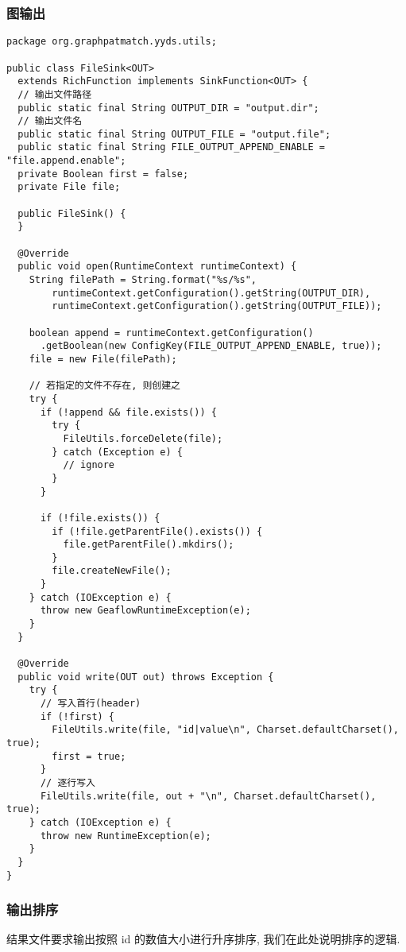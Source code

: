 \subsubsection{图输出}
\begin{center}
\begin{verbatim}
package org.graphpatmatch.yyds.utils;

public class FileSink<OUT>
  extends RichFunction implements SinkFunction<OUT> {
  // 输出文件路径
  public static final String OUTPUT_DIR = "output.dir";
  // 输出文件名
  public static final String OUTPUT_FILE = "output.file";
  public static final String FILE_OUTPUT_APPEND_ENABLE = "file.append.enable";
  private Boolean first = false;
  private File file;

  public FileSink() {
  }

  @Override
  public void open(RuntimeContext runtimeContext) {
    String filePath = String.format("%s/%s",
        runtimeContext.getConfiguration().getString(OUTPUT_DIR),
        runtimeContext.getConfiguration().getString(OUTPUT_FILE));

    boolean append = runtimeContext.getConfiguration()
      .getBoolean(new ConfigKey(FILE_OUTPUT_APPEND_ENABLE, true));
    file = new File(filePath);

    // 若指定的文件不存在, 则创建之
    try {
      if (!append && file.exists()) {
        try {
          FileUtils.forceDelete(file);
        } catch (Exception e) {
          // ignore
        }
      }

      if (!file.exists()) {
        if (!file.getParentFile().exists()) {
          file.getParentFile().mkdirs();
        }
        file.createNewFile();
      }
    } catch (IOException e) {
      throw new GeaflowRuntimeException(e);
    }
  }

  @Override
  public void write(OUT out) throws Exception {
    try {
      // 写入首行(header)
      if (!first) {
        FileUtils.write(file, "id|value\n", Charset.defaultCharset(), true);
        first = true;
      }
      // 逐行写入
      FileUtils.write(file, out + "\n", Charset.defaultCharset(), true);
    } catch (IOException e) {
      throw new RuntimeException(e);
    }
  }
}
\end{verbatim}
\end{center}

\subsubsection{输出排序}
结果文件要求输出按照 id 的数值大小进行升序排序, 我们在此处说明排序的逻辑.

